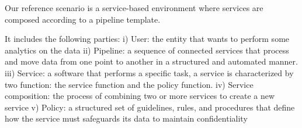 Our reference scenario is a service-based environment where services are composed according to a pipeline template.

It includes the following parties:
i) User: the entity that wants to perform some analytics on the data
ii) Pipeline: a sequence of connected services that process and move data from one point to another in a structured and automated manner.
iii) Service: a software that performs a specific task, a service is characterized by two function: the service function and the policy function.
iv) Service composition: the process of combining two or more services to create a new service
v) Policy: a structured set of guidelines, rules, and procedures that define how the service must safeguards its data to maintain confidentiality

